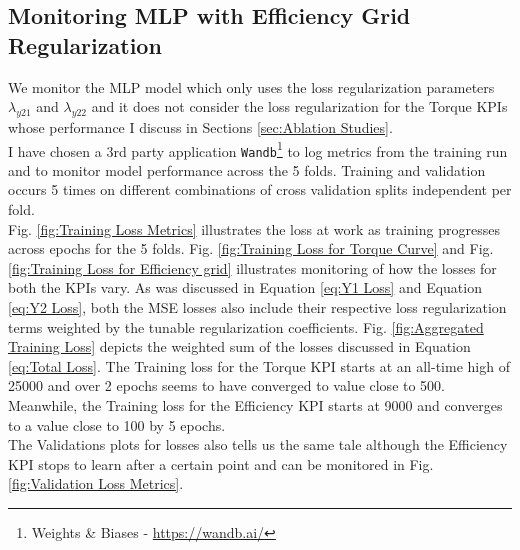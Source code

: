 \documentclass{report} %
\begin{document}
\subsection{Monitoring MLP with Efficiency Grid Regularization}\label{subsec:Monitoring MLP with Efficiency Grid Regularization}

We monitor the \ac{MLP} model which only uses the loss regularization parameters \textit{$\lambda_{y21}$} and \textit{$\lambda_{y22}$} and it does not consider the loss  
regularization for the Torque \ac{KPI}s whose performance I discuss in Sections \ref{sec:Ablation Studies}.\\
I have chosen a 3rd party application \texttt{Wandb}\footnote{Weights \& Biases - \url{https://wandb.ai/}} to log metrics from the training run and to monitor model 
performance across the 5 folds. Training and validation occurs 5 times on different combinations of cross validation splits independent per fold.\\

Fig. \ref{fig:Training Loss Metrics} illustrates the loss at work as training progresses across epochs for the 5 folds. 
Fig. \ref{fig:Training Loss for Torque Curve} and Fig. \ref{fig:Training Loss for Efficiency grid} illustrates monitoring of how the losses for both the \ac{KPI}s vary. 
As was discussed in Equation \ref{eq:Y1 Loss} and Equation \ref{eq:Y2 Loss}, both the \ac{MSE} losses 
also include their respective loss regularization terms weighted by the tunable regularization coefficients. 
Fig. \ref{fig:Aggregated Training Loss} depicts the weighted sum of the losses discussed in Equation \ref{eq:Total Loss}.
The Training loss for the Torque \ac{KPI} starts at an all-time high of 25000 and over 2 epochs seems to have converged to value close to 500.
Meanwhile, the Training loss for the Efficiency \ac{KPI} starts at 9000 and converges to a value close to 100 by 5 epochs.\\
The Validations plots for losses also tells us the same tale although the Efficiency \ac{KPI} stops to learn after a certain point and can be monitored in Fig. 
\ref{fig:Validation Loss Metrics}.
\end{document}
